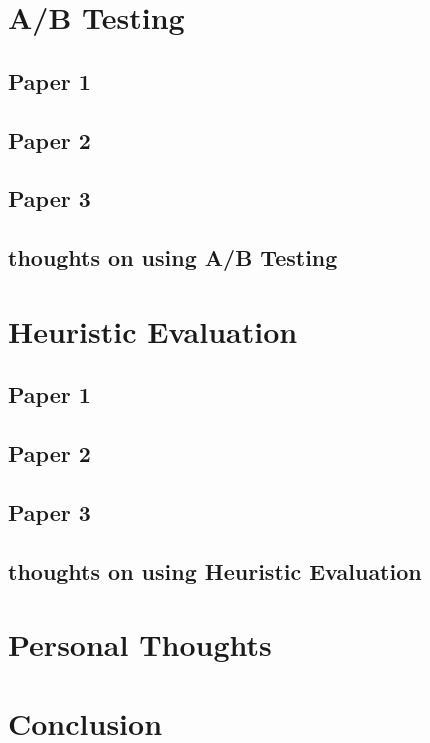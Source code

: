 \documentclass{scrartcl}
\begin{document}
\section{A/B Testing}

\subsection{Paper 1}

\subsection{Paper 2}

\subsection{Paper 3}

\subsection{thoughts on using A/B Testing}

\section{Heuristic Evaluation}

\subsection{Paper 1}

\subsection{Paper 2}

\subsection{Paper 3}

\subsection{thoughts on using Heuristic Evaluation}


\section{Personal Thoughts}

\section{Conclusion}




\end{document}
